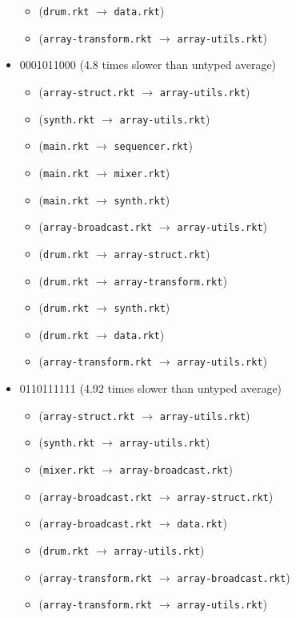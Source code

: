 \documentclass{article}
\newcommand{\mono}[1]{\texttt{#1}}
\begin{document}
\begin{itemize}
\begin{itemize}
  \item (\mono{drum.rkt} $\rightarrow$ \mono{data.rkt})
  \item (\mono{array-transform.rkt} $\rightarrow$ \mono{array-utils.rkt})
  \end{itemize}
\item 0001011000 (4.8 times slower than untyped average)
  \begin{itemize}
  \item (\mono{array-struct.rkt} $\rightarrow$ \mono{array-utils.rkt})
  \item (\mono{synth.rkt} $\rightarrow$ \mono{array-utils.rkt})
  \item (\mono{main.rkt} $\rightarrow$ \mono{sequencer.rkt})
  \item (\mono{main.rkt} $\rightarrow$ \mono{mixer.rkt})
  \item (\mono{main.rkt} $\rightarrow$ \mono{synth.rkt})
  \item (\mono{array-broadcast.rkt} $\rightarrow$ \mono{array-utils.rkt})
  \item (\mono{drum.rkt} $\rightarrow$ \mono{array-struct.rkt})
  \item (\mono{drum.rkt} $\rightarrow$ \mono{array-transform.rkt})
  \item (\mono{drum.rkt} $\rightarrow$ \mono{synth.rkt})
  \item (\mono{drum.rkt} $\rightarrow$ \mono{data.rkt})
  \item (\mono{array-transform.rkt} $\rightarrow$ \mono{array-utils.rkt})
  \end{itemize}
\item 0110111111 (4.92 times slower than untyped average)
  \begin{itemize}
  \item (\mono{array-struct.rkt} $\rightarrow$ \mono{array-utils.rkt})
  \item (\mono{synth.rkt} $\rightarrow$ \mono{array-utils.rkt})
  \item (\mono{mixer.rkt} $\rightarrow$ \mono{array-broadcast.rkt})
  \item (\mono{array-broadcast.rkt} $\rightarrow$ \mono{array-struct.rkt})
  \item (\mono{array-broadcast.rkt} $\rightarrow$ \mono{data.rkt})
  \item (\mono{drum.rkt} $\rightarrow$ \mono{array-utils.rkt})
  \item (\mono{array-transform.rkt} $\rightarrow$ \mono{array-broadcast.rkt})
  \item (\mono{array-transform.rkt} $\rightarrow$ \mono{array-utils.rkt})

\end{itemize}
\end{itemize}
\end{document}
